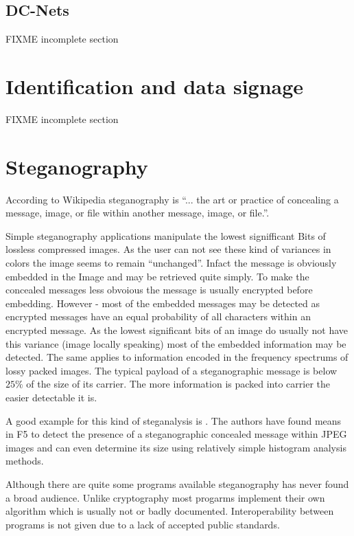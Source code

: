 \subsection{DC-Nets}
\cite{chaum-dc}
FIXME incomplete section

\section{Identification and data signage}
FIXME incomplete section

\section{Steganography}
According to Wikipedia steganography\cite{wiki:steganographie} is "`... the art or practice of concealing a message, image, or file within another message, image, or file."'. \par

Simple steganography applications manipulate the lowest signifficant Bits of lossless compressed images. As the user can not see these kind of variances in colors the image seems to remain "`unchanged"'. Infact the message is obviously embedded in the Image and may be retrieved quite simply. To make the concealed messages less obvoious the message is usually encrypted before embedding. However - most of the embedded messages may be detected as encrypted messages have an equal probability of all characters within an encrypted message. As the lowest significant bits of an image do usually not have this variance (image locally speaking) most of the embedded information may be detected. The same applies to information encoded in the frequency spectrums of lossy packed images. The typical payload of a steganographic message is below $25\%$ of the size of its carrier. The more information is packed into carrier the easier detectable it is.\par

A good example for this kind of steganalysis is . The authors have found means in F5\cite{f5} to detect the presence of a steganographic concealed message within JPEG images and can even determine its size using relatively simple histogram analysis methods.\par

Although there are quite some programs available steganography has never found a broad audience. Unlike cryptography most progarms implement their own algorithm which is usually not or badly documented. Interoperability between programs is not given due to a lack of accepted public standards. 


